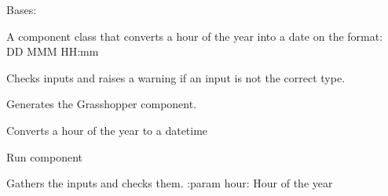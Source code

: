 \documentclass[letterpaper,10pt,english]{sphinxmanual}
\begin{document}
\begin{fulllineitems}
\label{\detokenize{miscellaneous:livestock.components.misc.HourToDate}}
Bases: {\hyperref[\detokenize{superclass:livestock.components.component.GHComponent}]{}}

A component class that converts a hour of the year into a date on the format: DD MMM HH:mm

\begin{fulllineitems}
\label{\detokenize{miscellaneous:livestock.components.misc.HourToDate.check_inputs}}
Checks inputs and raises a warning if an input is not the correct type.

\end{fulllineitems}


\begin{fulllineitems}
\label{\detokenize{miscellaneous:livestock.components.misc.HourToDate.config}}
Generates the Grasshopper component.

\end{fulllineitems}


\begin{fulllineitems}
\label{\detokenize{miscellaneous:livestock.components.misc.HourToDate.convert_date}}
Converts a hour of the year to a datetime

\end{fulllineitems}


\begin{fulllineitems}
\label{\detokenize{miscellaneous:livestock.components.misc.HourToDate.run}}
Run component

\end{fulllineitems}


\begin{fulllineitems}
\label{\detokenize{miscellaneous:livestock.components.misc.HourToDate.run_checks}}
Gathers the inputs and checks them.
:param hour: Hour of the year

\end{fulllineitems}


\end{fulllineitems}
\end{document}
